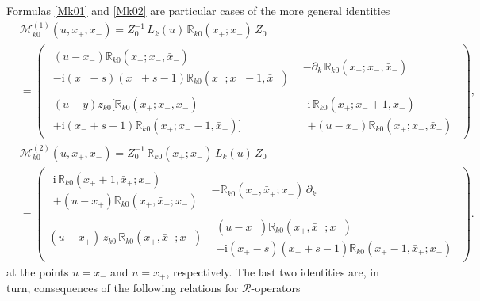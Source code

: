 \documentclass[a4paper,11pt]{article}
\renewcommand{\imath}{\mathrm{i}}
\numberwithin{equation}{section}
\begin{document}
Formulas \eqref{Mk01} and \eqref{Mk02} are particular cases of the more general identities
\begin{align}
	& \nonumber
	\mathcal{M}^{(1)}_{k0}(u,x_+,x_-) = Z_0^{-1}
	\,L_k(u)\,\mathbb{R}_{k0}(x_+;x_-)\,Z_0 \\
	& \label{tr1}
	=
	\left(
	\begin{array}{c|c}
		\begin{array}{l}
			(u-x_-)\mathbb{R}_{k0}(x_+;x_-,\bar{x}_-) \\
			-\imath(x_--s)(x_-+s-1)\mathbb{R}_{k0}(x_+;x_--1,\bar{x}_-)
		\end{array}
		& -\partial_k\,\mathbb{R}_{k0}(x_+;x_-,\bar{x}_-) \\[6pt]
		\hline
		\begin{array}{l}
			(u-y)z_{k0}\bigl[\mathbb{R}_{k0}(x_+;x_-,\bar{x}_-) \\
			+\imath(x_-+s-1)\mathbb{R}_{k0}(x_+;x_--1,\bar{x}_-)\bigr]
		\end{array} &
		\begin{array}{l}
			\imath\,\mathbb{R}_{k0}(x_+;x_-+1,\bar{x}_-) \\
			+ (u-x_-)\mathbb{R}_{k0}(x_+;x_-,\bar{x}_-)
		\end{array}
	\end{array}
	\right), \\
	& \nonumber
	\mathcal{M}^{(2)}_{k0}(u,x_+,x_-) = Z_0^{-1}
	\,\mathbb{R}_{k0}(x_+;x_-)\,L_k(u)\,Z_0 \\
	& \label{tr2}
	=
	\left(
	\begin{array}{c|c}
		\begin{array}{l}
			\imath\,\mathbb{R}_{k0}(x_++1,\bar{x}_+;x_-) \\
			+ (u-x_+)\mathbb{R}_{k0}(x_+,\bar{x}_+;x_-)
		\end{array}
		& -\mathbb{R}_{k0}(x_+,\bar{x}_+;x_-) \, \partial_k \\
		\hline
		(u-x_+)\,z_{k0}\,\mathbb{R}_{k0}(x_+,\bar{x}_+;x_-) &
		\begin{array}{l}
			(u-x_+)\mathbb{R}_{k0}(x_+,\bar{x}_+;x_-) \\
			-\imath(x_+-s)(x_++s-1)\mathbb{R}_{k0}(x_+-1,\bar{x}_+;x_-)
		\end{array}
	\end{array}
	\right) \!.
\end{align}
at the points $u=x_-$ and $u=x_+$, respectively.
The last two identities are, in turn, consequences of the following relations for $\mathcal{R}$-operators
\end{document}
